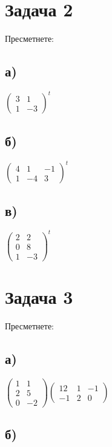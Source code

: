\documentclass[12pt]{article}
\begin{document}
\section*{Задача 2}
    
Пресметнете:

\subsection*{а)}

$\begin{pmatrix}
    3 & 1 \\
    1 & -3
\end{pmatrix}^t$

\subsection*{б)}

$\begin{pmatrix}
    4 & 1 & -1 \\
    1 & -4 & 3
\end{pmatrix}^t$

\subsection*{в)}

$\begin{pmatrix}
    2 & 2 \\
    0 & 8 \\
    1 & -3
\end{pmatrix}^t$

\section*{Задача 3}

Пресметнете:

\subsection*{а)}

$\begin{pmatrix}
    1 & 1 \\
    2 & 5 \\
    0 & -2
\end{pmatrix} \begin{pmatrix}
    12 & 1 & -1 \\
    -1 & 2 & 0
\end{pmatrix}$

\subsection*{б)}
\end{document}
